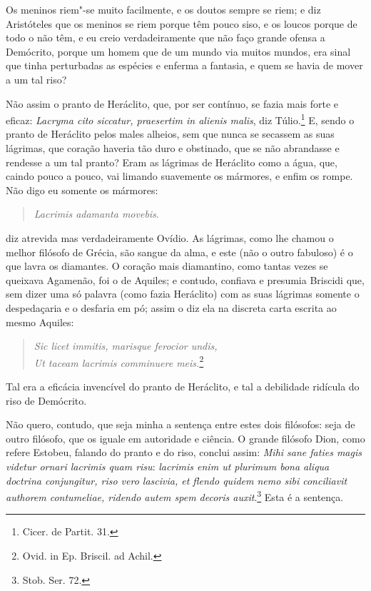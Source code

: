 Os meninos riem"-se muito facilmente, e os doutos sempre se riem; e diz
Aristóteles que os meninos se riem porque têm pouco siso, e os loucos
porque de todo o não têm, e eu creio verdadeiramente que não faço grande
ofensa a Demócrito, porque um homem que de um mundo via muitos mundos,
era sinal que tinha perturbadas as espécies e enferma a fantasia, e quem
se havia de mover a um tal riso?

Não assim o pranto de Heráclito, que, por ser contínuo, se fazia mais
forte e eficaz:
\emph{Lacryma cito siccatur, praesertim in alienis malis}, diz Túlio.\footnote{Cicer. de Partit. 31.}
E, sendo o pranto de
Heráclito pelos males alheios, sem que nunca se secassem as suas
lágrimas, que coração haveria tão duro e obstinado, que se não
abrandasse e rendesse a um tal pranto? Eram as lágrimas de Heráclito
como a água, que, caindo pouco a pouco, vai limando suavemente os
mármores, e enfim os rompe. Não digo eu somente os mármores:


\begin{verse}
\emph{Lacrimis adamanta movebis}.
\end{verse}

\noindent{}diz atrevida mas verdadeiramente Ovídio. As lágrimas, como lhe chamou o
melhor filósofo de Grécia, são sangue da alma, e este (não o outro
fabuloso) é o que lavra os diamantes. O coração mais diamantino, como
tantas vezes se queixava Agamenão, foi o de Aquiles; e contudo, confiava
e presumia Briscidi que, sem dizer uma só palavra (como fazia Heráclito)
com as suas lágrimas somente o despedaçaria e o desfaria em pó; assim
o diz ela na discreta carta escrita ao mesmo Aquiles:

\begin{verse}
\emph{Sic licet immitis, marisque ferocior undis,}\\
\emph{Ut taceam lacrimis comminuere meis.}\footnote{Ovid. in Ep. Briscil. ad Achil.}
\end{verse}

Tal era a eficácia invencível do pranto de Heráclito, e tal a debilidade
ridícula do riso de Demócrito.

Não quero, contudo, que seja minha a sentença entre estes dois
filósofos: seja de outro filósofo, que os iguale em autoridade e
ciência. O grande filósofo Dion, como
refere Estobeu, falando do pranto e do riso, conclui assim: \emph{Mihi
sane faties magis videtur ornari lacrimis quam risu}: \emph{lacrimis
enim ut plurimum bona aliqua doctrina conjungitur, riso vero lascivia,
et flendo quidem nemo sibi conciliavit authorem contumeliae, ridendo autem spem decoris auxit}.\footnote{Stob. Ser. 72.} Esta é a sentença.

